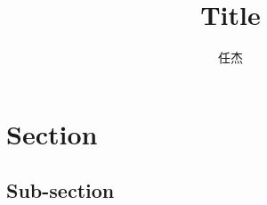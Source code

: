 \documentclass[10pt,UTF8]{ctexart}
\begin{document}
\title{Title}
\author{任杰}
\date{}

\maketitle


\section*{Section}
\noindent


\subsection*{Sub-section}
\noindent




\end{document}
